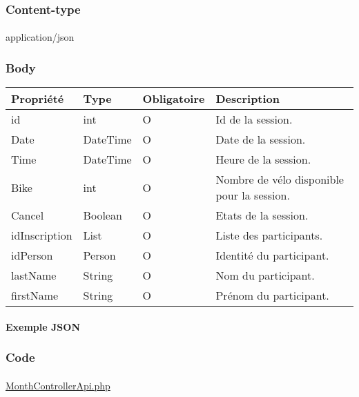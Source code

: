 	\subsubsection{Content-type}
		\paragraph{}
			application/json
	
	\subsubsection{Body}
		\begin{center}
			\begin{tabularx}{\textwidth}{| T{0.2122\textwidth} | S{0.22\textwidth} | S{0.15\textwidth} | S{0.3\textwidth} |}
				\hline
				Propriété & Type & Obligatoire & Description \\
				\hline
				id & int & O & Id de la session. \\
				\hline
				Date & DateTime & O & Date de la session. \\
				\hline
				Time & DateTime & O & Heure de la session. \\
				\hline
				Bike & int & O & Nombre de vélo disponible pour la session. \\
				\hline
				Cancel & Boolean & O & Etats de la session. \\
				\hline
				idInscription & List & O & Liste des participants. \\
				\hline
				idPerson & Person & O & Identité du participant. \\
				\hline
				lastName & String & O & Nom du participant. \\
				\hline
				firstName & String & O & Prénom du participant. \\
				\hline
			\end{tabularx}
		\end{center}
		
	\newpage
		\paragraph{Exemple JSON}
			\paragraph{}
			
			
	\subsubsection{Code}
		\paragraph{}
			\href{https://github.com/victorsmits/Aquabike/blob/master/backend/src/Controller/API/MonthControllerApi.php}{MonthControllerApi.php}